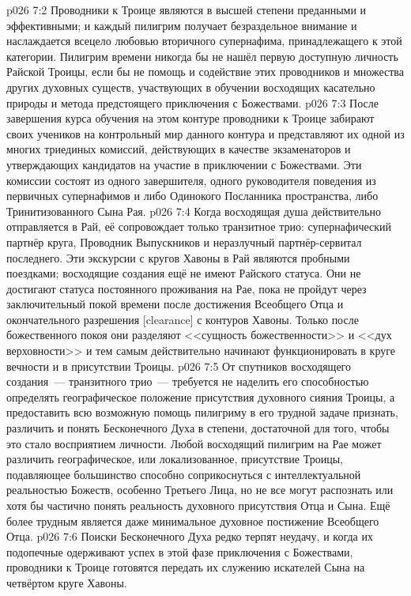 \vs p026 7:2 Проводники к Троице являются в высшей степени преданными и эффективными; и каждый пилигрим получает безраздельное внимание и наслаждается всецело любовью вторичного супернафима, принадлежащего к этой категории. Пилигрим времени никогда бы не нашёл первую доступную личность Райской Троицы, если бы не помощь и содействие этих проводников и множества других духовных существ, участвующих в обучении восходящих касательно природы и метода предстоящего приключения с Божествами.
\vs p026 7:3 После завершения курса обучения на этом контуре проводники к Троице забирают своих учеников на контрольный мир данного контура и представляют их одной из многих триединых комиссий, действующих в качестве экзаменаторов и утверждающих кандидатов на участие в приключении с Божествами. Эти комиссии состоят из одного завершителя, одного руководителя поведения из первичных супернафимов и либо Одинокого Посланника пространства, либо Тринитизованного Сына Рая.
\vs p026 7:4 Когда восходящая душа действительно отправляется в Рай, её сопровождает только транзитное трио: супернафический партнёр круга, Проводник Выпускников и неразлучный партнёр\hyp{}сервитал последнего. Эти экскурсии с кругов Хавоны в Рай являются пробными поездками; восходящие создания ещё не имеют Райского статуса. Они не достигают статуса постоянного проживания на Рае, пока не пройдут через заключительный покой времени после достижения Всеобщего Отца и окончательного разрешения [clearance] с контуров Хавоны. Только после божественного покоя они разделяют <<сущность божественности>> и <<дух верховности>> и тем самым действительно начинают функционировать в круге вечности и в присутствии Троицы.
\vs p026 7:5 \pc От спутников восходящего создания~--- транзитного трио~--- требуется не наделить его способностью определять географическое положение присутствия духовного сияния Троицы, а предоставить всю возможную помощь пилигриму в его трудной задаче признать, различить и понять Бесконечного Духа в степени, достаточной для того, чтобы это стало восприятием личности. Любой восходящий пилигрим на Рае может различить географическое, или локализованное, присутствие Троицы, подавляющее большинство способно соприкоснуться с интеллектуальной реальностью Божеств, особенно Третьего Лица, но не все могут распознать или хотя бы частично понять реальность духовного присутствия Отца и Сына. Ещё более трудным является даже минимальное духовное постижение Всеобщего Отца.
\vs p026 7:6 Поиски Бесконечного Духа редко терпят неудачу, и когда их подопечные одерживают успех в этой фазе приключения с Божествами, проводники к Троице готовятся передать их служению искателей Сына на четвёртом круге Хавоны.
